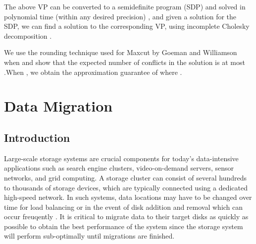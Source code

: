 \documentclass[titlepage, 11pt]{article}
\begin{document}
The above VP can be converted to a semidefinite program (SDP) and
solved in polynomial time (within any desired precision) 
\cite{ali95,gls81,gls87,nn90,nn94}, and given a solution for the SDP,
we can find a solution to the corresponding VP, 
using incomplete Cholesky decomposition \cite{golub83}. 

We use the rounding technique used for {\sc Maxcut} by Goeman and Williamson 
\cite{GW} when  and show that the expected number of conflicts 
in the solution is at most .When , we obtain  the approximation guarantee of   
where .\\



\section{Data Migration}

\subsection{Introduction}

Large-scale storage systems are crucial components for today's data-intensive 
applications such as search engine clusters, video-on-demand servers, sensor networks, and grid computing.
A storage cluster can consist of several hundreds to thousands of storage devices,
which are typically 
connected using a dedicated high-speed network. In such systems, data locations may have to be changed over time 
for load balancing or in the event of disk addition and removal which can occur freuqently \cite{UCSB}.
It is critical to migrate data to their target disks
as quickly as possible to obtain the best performance of the system
since the storage system will perform sub-optimally  
until migrations are finished.
\end{document}
